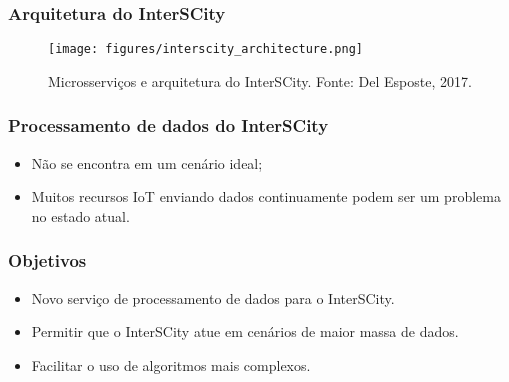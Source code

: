 \begin{frame}
    \frametitle{Arquitetura do InterSCity}
    \begin{figure}
        \texttt{[image: figures/interscity\_architecture.png]}
        \caption{Microsserviços e arquitetura do InterSCity. Fonte: Del Esposte, 2017.}
    \end{figure}
\end{frame}

\begin{frame}
    \frametitle{Processamento de dados do InterSCity}
    \begin{itemize}
        \item<2-> Não se encontra em um cenário ideal;
        \item<3-> Muitos recursos IoT enviando dados continuamente podem ser um
            problema no estado atual.
    \end{itemize}
\end{frame}

\begin{frame}
    \frametitle{Objetivos}
    \begin{itemize}
        \item Novo serviço de processamento de dados para o InterSCity.
        \item Permitir que o InterSCity atue em cenários de maior massa de dados.
        \item Facilitar o uso de algoritmos mais complexos.
    \end{itemize}
\end{frame}
